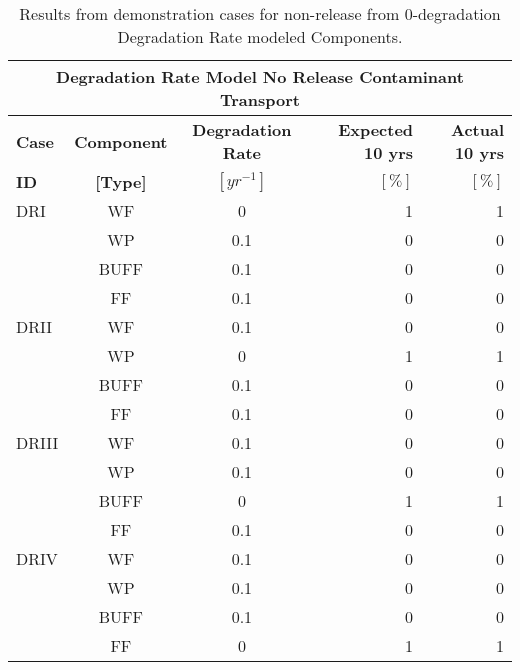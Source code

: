 \begin{table}
\centering
\footnotesize{
\begin{tabularx}{\textwidth}{|X|c|c|r|r|}
  \multicolumn{5}{c}{\textbf{Degradation Rate Model No Release Contaminant Transport}}\\
  \hline
  \textbf{Case}  &  \textbf{Component} &  \textbf{Degradation Rate} & \textbf{Expected 10 yrs} & \textbf{Actual 10 yrs}\\
  \textbf{ID}    & \textbf{[Type]} &  \textbf{$[yr^{-1}]$}  &  $[\%]$  & $[\%]$\\
  \hline
  DRI     &  WF    &  0   & 1 & 1\\
          &  WP    &  0.1 & 0 & 0 \\
          &  BUFF  &  0.1 & 0 & 0 \\
          &  FF    &  0.1 & 0 & 0\\
  \hline
  DRII    &  WF    &  0.1 & 0 & 0\\
          &  WP    &  0   & 1 & 1\\
          &  BUFF  &  0.1 & 0 & 0\\
          &  FF    &  0.1 & 0 & 0\\
  \hline
  DRIII   &  WF    &  0.1 & 0 & 0\\
          &  WP    &  0.1 & 0 & 0\\
          &  BUFF  &  0   & 1 & 1\\
          &  FF    &  0.1 & 0 & 0\\
  \hline
  DRIV    &  WF    &  0.1 & 0 & 0\\
          &  WP    &  0.1 & 0 & 0\\
          &  BUFF  &  0.1 & 0 & 0\\
          &  FF    &  0   & 1 & 1\\
  \hline
\end{tabularx}
\caption[Degradation rate model no release problem results.]{Results from demonstration cases for non-release from 0-degradation Degradation Rate modeled Components.}
\label{tab:dr_no_release}
}
\end{table}
